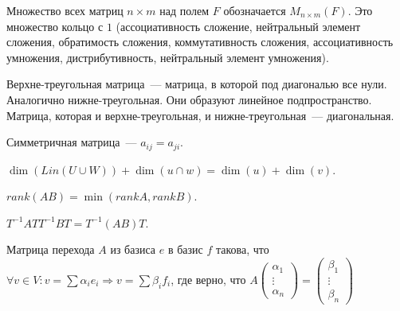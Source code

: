 \documentclass[12pt]{article}
\begin{document}
	\begin{definition}
		 Множество всех матриц $n \times m$ над полем $F$ обозначается $M_{n \times m}(F)$. Это множество кольцо с $1$ (ассоциативность сложение, нейтральный элемент сложения, обратимость сложения, коммутативность сложения, ассоциативность умножения, дистрибутивность, нейтральный элемент умножения).
	\end{definition}
	\begin{definition}
		Верхне-треугольная матрица~--- матрица, в которой под диагональю все нули. Аналогично нижне-треугольная. Они образуют линейное подпространство. Матрица, которая и верхне-треугольная, и нижне-треугольная~--- диагональная.
	\end{definition}
	\begin{definition}
		Симметричная матрица~--- $a_{ij} = a_{ji}$.
	\end{definition}
	\begin{statement}
		$\dim(Lin(U \cup W)) + \dim(u \cap w) = \dim(u) + \dim(v)$.
	\end{statement}
	\begin{statement}
		$rank(AB) = \min(rank A, rank B)$.
	\end{statement}
	\begin{statement}
		$T^{-1} A T T^{-1} B T = T^{-1} (A B) T$.
	\end{statement}
	\begin{definition}
		Матрица перехода $A$ из базиса $e$ в базис $f$ такова, что $\forall v \in V: v = \sum \alpha_i e_i \Rightarrow v = \sum \beta_i f_i$, где верно, что $A
		\left( \begin{smallmatrix}
			\alpha_1 \\
			\vdots \\
			\alpha_n
		\end{smallmatrix} \right) =
		\left( \begin{smallmatrix}
			\beta_1 \\
			\vdots \\
			\beta_n
		\end{smallmatrix} \right)
		$
	\end{definition}
\end{document}
